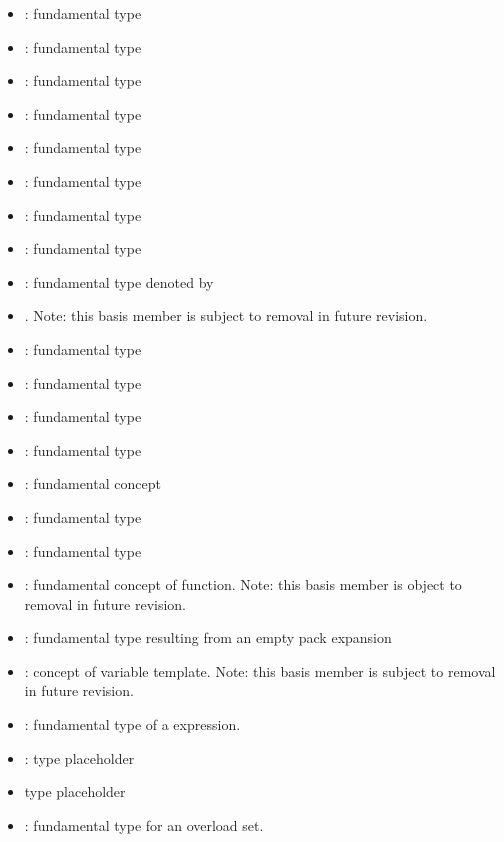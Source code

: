 \begin{itemize}
  \item {}: fundamental type 
  \item {}: fundamental type 
  \item {}: fundamental type 
  \item {}: fundamental type 
  \item {}: fundamental type 
  \item {}: fundamental type 
  \item {}: fundamental type 
  \item {}: fundamental type 
  \item {}: fundamental type denoted by 
  \item {}.  Note: this basis member is subject to removal in future revision.
  \item {}: fundamental type 
  \item {}: fundamental type 
  \item {}: fundamental type 
  \item {}: fundamental type 
  \item\label{sec:ifc:TypeBasis:Typename} : fundamental concept 
  \item {}: fundamental type 
  \item {}: fundamental type 
  \item {}: fundamental concept of function.  Note: this basis member is object to removal in future revision.
  \item {}: fundamental type resulting from an empty pack expansion
  \item {}: concept of variable template.  Note: this basis member is subject to removal in future revision.
  \item {}: fundamental type of a  expression.
  \item {}: type placeholder 
  \item {} type placeholder 
  \item {}:  fundamental type for an overload set.
\end{itemize}

